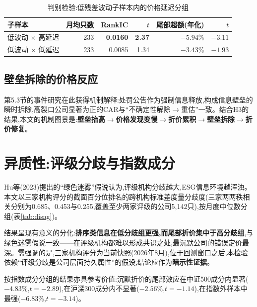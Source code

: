 \documentclass[UTF8, a4paper, fontset=fandol, zihao=-4]{ctexart}
\begin{document}
\begin{table}[H]
\centering
\begin{threeparttable}
\caption{判别检验:低残差波动子样本内的价格延迟分组}\label{tab:triple}
\begin{tabular}{lrrrrr}
\toprule
子样本 & 月均只数 & RankIC & $t$ & 尾部超额(年化) & $t$ \\
\midrule
低波动 $\times$ 高延迟 & 233 & \textbf{0.0160} & \textbf{2.37} & $\mathbf{-5.94}$\% & $\mathbf{-3.11}$ \\
低波动 $\times$ 低延迟 & 233 & 0.0085 & 1.34 & $-3.43$\% & $-1.93$ \\
\bottomrule
\end{tabular}
\end{threeparttable}
\end{table}

\subsection{壁垒拆除的价格反应}

第5.3节的事件研究在此获得机制解释:处罚公告作为强制信息释放,构成信息壁垒的瞬时拆除,高裂口公司显著为正的CAR与“不确定性解除$\to$重估”一致。结合H3的结果,本文的机制图景是:\textbf{壁垒抬高$\to$价格发现变慢$\to$折价累积$\to$壁垒拆除$\to$折价修复}。

\section{异质性:评级分歧与指数成分}

Hu等(2023)提出的“绿色迷雾”假说认为,评级机构分歧越大,ESG信息环境越浑浊。本文以三家机构评分的截面百分位排名的跨机构标准差度量分歧度(三家两两秩相关分别为0.685、0.453与0.255,覆盖至少两家评级的公司5{,}142只),按月度中位数分组(表\ref{tab:disag})。

结果呈现有意义的分化:\textbf{排序类信息在低分歧组更强,而尾部折价集中于高分歧组},与绿色迷雾假说一致——在评级机构都难以形成共识之处,最沉默公司的错误定价最深。需强调的是,三家机构评分为当前快照(2026年8月),位于回测窗口之后,本检验依赖“评级分歧是公司层面持久属性”的假设,结论应作为\textbf{暗示性证据}。

按指数成分分组的结果亦具参考价值:沉默折价的尾部效应在中证500成分内显著($-4.83$\%,$t=-2.89$),在沪深300成分内不显著($-2.56$\%,$t=-1.14$),在指数外样本中最强($-6.83$\%,$t=-3.14$)。
\end{document}
